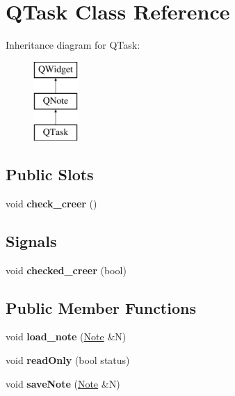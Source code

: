 \hypertarget{class_q_task}{}\section{Q\+Task Class Reference}
\label{class_q_task}
Inheritance diagram for Q\+Task\+:\begin{figure}[H]
\begin{center}
\leavevmode
\includegraphics[height=3.000000cm]{class_q_task}
\end{center}
\end{figure}
\subsection*{Public Slots}
\begin{DoxyCompactItemize}
\item 
\mbox{\label{class_q_task_a9ee271061467da09180f8106734bb327}} 
void {\bfseries check\+\_\+creer} ()
\end{DoxyCompactItemize}
\subsection*{Signals}
\begin{DoxyCompactItemize}
\item 
\mbox{\label{class_q_task_a21a78164df191b35a712ccb43c6bc7e2}} 
void {\bfseries checked\+\_\+creer} (bool)
\end{DoxyCompactItemize}
\subsection*{Public Member Functions}
\begin{DoxyCompactItemize}
\item 
\mbox{\label{class_q_task_a548fc51beaa1dcea345c362782aa11c0}} 
void {\bfseries load\+\_\+note} (\hyperlink{class_note}{Note} \&N)
\item 
\mbox{\label{class_q_task_a1bf9080c14e7a94094bde3fa315d66d9}} 
void {\bfseries read\+Only} (bool status)
\item 
\mbox{\label{class_q_task_ae304b097cdfd1169d2b190bbad3922eb}} 
void {\bfseries save\+Note} (\hyperlink{class_note}{Note} \&N)
\end{DoxyCompactItemize}
